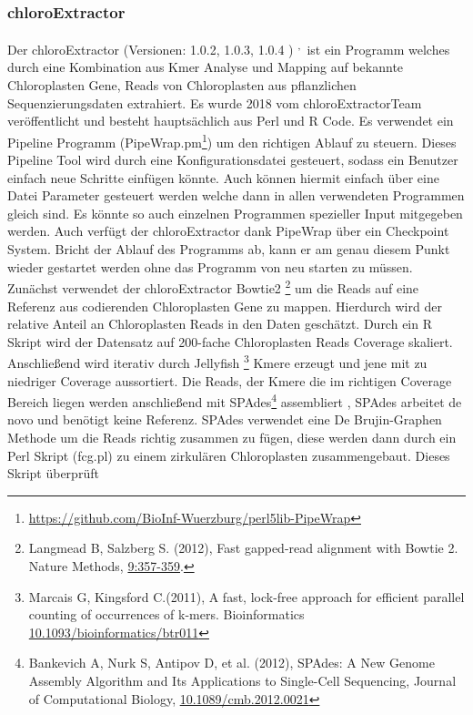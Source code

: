 \documentclass{scrartcl}
\begin{document}
\subsubsection{chloroExtractor}
\label{sec-2-5-1}
Der chloroExtractor (Versionen: 1.0.2, 1.0.3, 1.0.4 ) \footnotemark[16]{}\textsuperscript{,}\,\footnotemark[17]{} ist ein Programm welches durch eine Kombination aus Kmer Analyse und Mapping auf bekannte Chloroplasten Gene, Reads von Chloroplasten aus pflanzlichen Sequenzierungsdaten
extrahiert. Es wurde 2018 vom chloroExtractorTeam veröffentlicht \footnotemark[16]{} und besteht hauptsächlich aus Perl und R Code. Es verwendet ein Pipeline Programm (PipeWrap.pm\footnote{\url{https://github.com/BioInf-Wuerzburg/perl5lib-PipeWrap}}) um den richtigen Ablauf zu steuern.
Dieses Pipeline Tool wird durch eine Konfigurationsdatei gesteuert, sodass ein Benutzer einfach neue Schritte einfügen könnte. Auch können hiermit einfach über eine Datei Parameter gesteuert werden welche dann in 
allen verwendeten Programmen gleich sind. Es könnte so auch einzelnen Programmen spezieller Input mitgegeben werden. Auch verfügt der chloroExtractor dank PipeWrap über ein Checkpoint System. Bricht der Ablauf des Programms
ab, kann er am genau diesem Punkt wieder gestartet werden ohne das Programm von neu starten zu müssen. Zunächst verwendet der chloroExtractor Bowtie2 \footnote{Langmead B, Salzberg S. (2012), Fast gapped-read alignment with Bowtie 2. Nature Methods, \url{9:357-359}.} um die Reads auf eine Referenz aus codierenden Chloroplasten Gene zu mappen.
Hierdurch wird der relative Anteil an Chloroplasten Reads in den Daten geschätzt. Durch ein R Skript wird der Datensatz auf 200-fache Chloroplasten Reads Coverage skaliert. Anschließend wird iterativ durch Jellyfish \footnote{Marcais G, Kingsford C.(2011), A fast, lock-free approach for efficient parallel counting of occurrences of k-mers. Bioinformatics  \url{10.1093/bioinformatics/btr011}} Kmere erzeugt und jene mit
zu niedriger Coverage aussortiert. Die Reads, der Kmere die im richtigen Coverage Bereich liegen werden anschließend mit SPAdes\footnote{Bankevich A, Nurk S, Antipov D, et al. (2012), SPAdes: A New Genome Assembly Algorithm and Its Applications to Single-Cell Sequencing, Journal of Computational Biology, \url{10.1089/cmb.2012.0021}} assembliert , SPAdes arbeitet de novo und benötigt
keine Referenz. SPAdes verwendet eine De Brujin-Graphen Methode um die Reads richtig zusammen zu fügen, diese werden dann durch ein Perl Skript (fcg.pl) zu einem zirkulären Chloroplasten zusammengebaut. Dieses Skript überprüft
\end{document}
